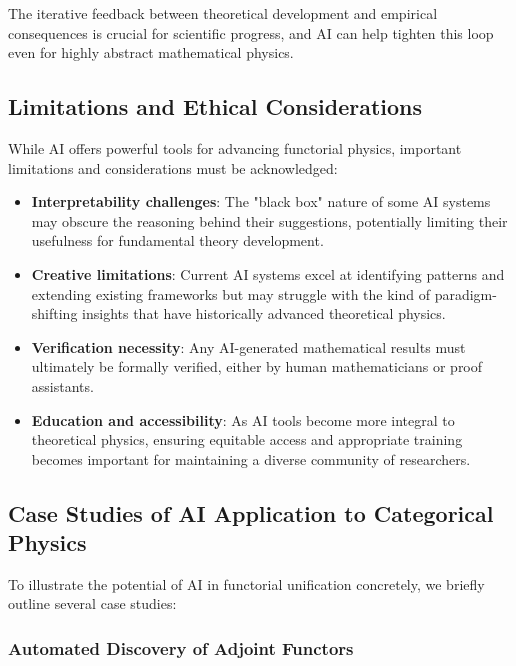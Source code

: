 The iterative feedback between theoretical development and empirical consequences is crucial for scientific progress, and AI can help tighten this loop even for highly abstract mathematical physics.

\subsection{Limitations and Ethical Considerations}

While AI offers powerful tools for advancing functorial physics, important limitations and considerations must be acknowledged:

\begin{itemize}
    \item \textbf{Interpretability challenges}: The "black box" nature of some AI systems may obscure the reasoning behind their suggestions, potentially limiting their usefulness for fundamental theory development.
    
    \item \textbf{Creative limitations}: Current AI systems excel at identifying patterns and extending existing frameworks but may struggle with the kind of paradigm-shifting insights that have historically advanced theoretical physics.
    
    \item \textbf{Verification necessity}: Any AI-generated mathematical results must ultimately be formally verified, either by human mathematicians or proof assistants.
    
    \item \textbf{Education and accessibility}: As AI tools become more integral to theoretical physics, ensuring equitable access and appropriate training becomes important for maintaining a diverse community of researchers.
\end{itemize}

\subsection{Case Studies of AI Application to Categorical Physics}

To illustrate the potential of AI in functorial unification concretely, we briefly outline several case studies:

\subsubsection{Automated Discovery of Adjoint Functors}

